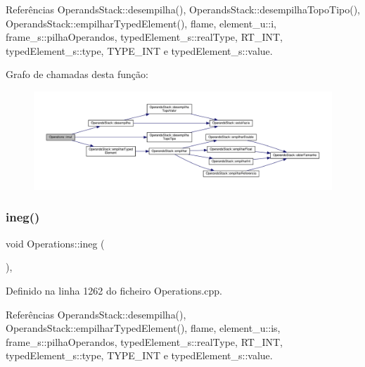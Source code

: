 Referências Operands\+Stack\+::desempilha(), Operands\+Stack\+::desempilha\+Topo\+Tipo(), Operands\+Stack\+::empilhar\+Typed\+Element(), flame, element\+\_\+u\+::i, frame\+\_\+s\+::pilha\+Operandos, typed\+Element\+\_\+s\+::real\+Type, R\+T\+\_\+\+I\+NT, typed\+Element\+\_\+s\+::type, T\+Y\+P\+E\+\_\+\+I\+NT e typed\+Element\+\_\+s\+::value.

Grafo de chamadas desta função\+:
\nopagebreak
\begin{figure}[H]
\begin{center}
\leavevmode
\includegraphics[width=350pt]{classOperations_a01b2ffdd380327b31b03657eb99b8a81_cgraph}
\end{center}
\end{figure}
\mbox{\label{classOperations_a819d5dd66c64a6801a1599b5abf81ae7}} 
\subsubsection{\texorpdfstring{ineg()}{ineg()}}
{\footnotesize\ttfamily void Operations\+::ineg (\begin{DoxyParamCaption}{ }\end{DoxyParamCaption})\hspace{0.3cm}{\ttfamily [static]}, {\ttfamily [private]}}



Definido na linha 1262 do ficheiro Operations.\+cpp.



Referências Operands\+Stack\+::desempilha(), Operands\+Stack\+::empilhar\+Typed\+Element(), flame, element\+\_\+u\+::is, frame\+\_\+s\+::pilha\+Operandos, typed\+Element\+\_\+s\+::real\+Type, R\+T\+\_\+\+I\+NT, typed\+Element\+\_\+s\+::type, T\+Y\+P\+E\+\_\+\+I\+NT e typed\+Element\+\_\+s\+::value.

